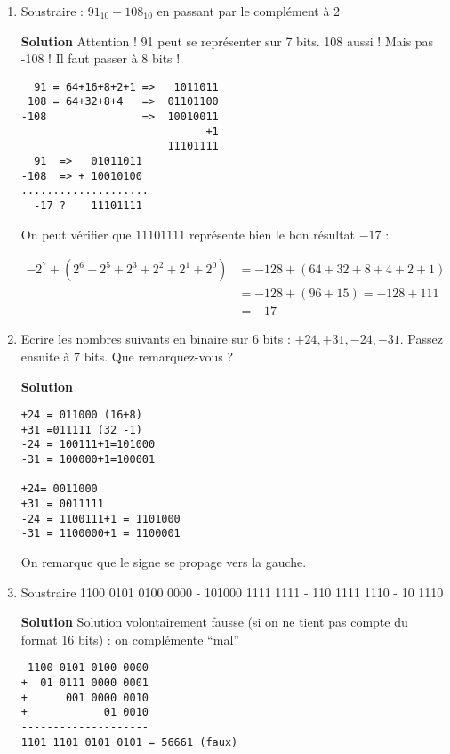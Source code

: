 \documentclass[a4paper,11pt]{article}
\begin{document}
\begin{enumerate}
{\bf Solution}
On applique la formule (1) de l'énoncé : on inverse tous les bits et on ajoute 1 :
$$8=1000_2 \implies C2_6(8)=110111+1=111000 $$
On applique la formule (2) de l'énoncé :
$-2^5+2^4+2^3=-8$
Cela signifie que $111000$ est bien la valeur -8 représentée en complément à 2.


\item {Soustraire : $91_{10}-108_{10}$ en passant par le complément à 2}

{\bf Solution}
Attention ! 91 peut se représenter sur 7 bits. 108 aussi ! Mais pas -108 ! Il faut passer à 8 bits !
\begin{verbatim}
  91 = 64+16+8+2+1 =>   1011011
 108 = 64+32+8+4   =>  01101100
-108               =>  10010011
                             +1
                       11101111
  91  =>   01011011
-108  => + 10010100
....................
  -17 ?    11101111
\end{verbatim}

On peut vérifier que $11101111$ représente bien le bon résultat $-17$ :

\begin{align}
-2^7+(2^6+2^5+2^3+2^2+2^1+2^0) &= -128+(64+32+8+4+2+1) \nonumber \\
                             &= -128+(96+15)=-128+111 \nonumber\\
                             &=-17 \nonumber
\end{align}

\item {Ecrire les nombres suivants en binaire sur 6 bits : $+24,+31,-24,-31$. Passez ensuite à 7 bits. Que remarquez-vous ?}

{\bf Solution}
\begin{verbatim}
+24 = 011000 (16+8)
+31 =011111 (32 -1)
-24 = 100111+1=101000
-31 = 100000+1=100001

+24= 0011000
+31 = 0011111
-24 = 1100111+1 = 1101000
-31 = 1100000+1 = 1100001
\end{verbatim}

On remarque que le signe se propage vers la gauche.

\item { Soustraire 1100 0101 0100 0000 - 101000 1111 1111 - 110 1111 1110 - 10 1110}


{\bf Solution}
Solution volontairement fausse (si on ne tient pas compte du format 16 bits) : on complémente ``mal''
\begin{verbatim}
 1100 0101 0100 0000
+  01 0111 0000 0001
+      001 0000 0010
+            01 0010
--------------------
1101 1101 0101 0101 = 56661 (faux)


\end{verbatim}
\end{enumerate}
\end{document}

